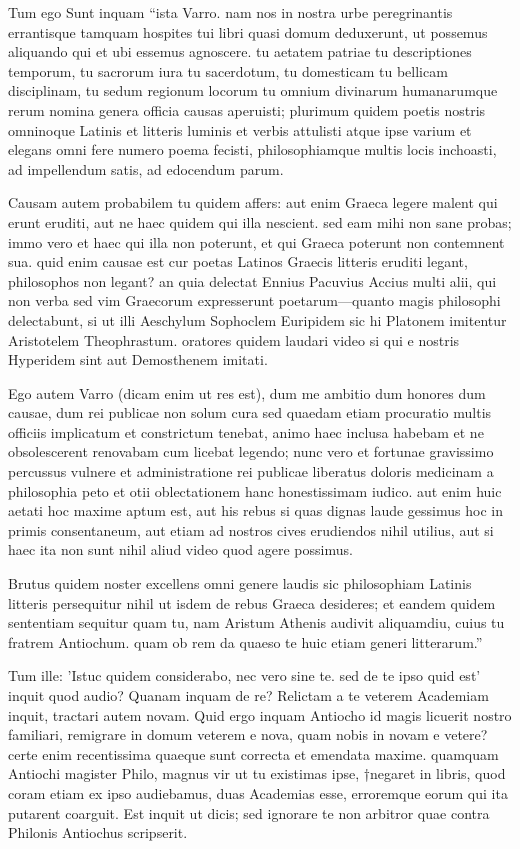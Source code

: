  Tum ego Sunt inquam ``ista Varro. nam nos in nostra urbe peregrinantis errantisque tamquam hospites tui libri quasi domum deduxerunt, ut possemus aliquando qui et ubi essemus agnoscere. tu aetatem patriae tu descriptiones temporum, tu sacrorum iura tu sacerdotum, tu domesticam tu bellicam disciplinam, tu sedum regionum locorum tu omnium divinarum humanarumque rerum nomina genera officia causas aperuisti; plurimum quidem poetis nostris omninoque Latinis et litteris luminis et verbis attulisti atque ipse varium et elegans omni fere numero poema fecisti, philosophiamque multis locis inchoasti, ad impellendum satis, ad edocendum parum.

 Causam autem probabilem tu quidem affers: aut enim Graeca legere malent qui erunt eruditi, aut ne haec quidem qui illa nescient. sed eam mihi non sane probas; immo vero et haec qui illa non poterunt, et qui Graeca poterunt non contemnent sua. quid enim causae est cur poetas Latinos Graecis litteris eruditi legant, philosophos non legant? an quia delectat Ennius Pacuvius Accius multi alii, qui non verba sed vim Graecorum expresserunt poetarum—quanto magis philosophi delectabunt, si ut illi Aeschylum Sophoclem Euripidem sic hi Platonem imitentur Aristotelem Theophrastum. oratores quidem laudari video si qui e nostris Hyperidem sint aut Demosthenem imitati.

 Ego autem Varro (dicam enim ut res est), dum me ambitio dum honores dum causae, dum rei publicae non solum cura sed quaedam etiam procuratio multis officiis implicatum et constrictum tenebat, animo haec inclusa habebam et ne obsolescerent renovabam cum licebat legendo; nunc vero et fortunae gravissimo percussus vulnere et administratione rei publicae liberatus doloris medicinam a philosophia peto et otii oblectationem hanc honestissimam iudico. aut enim huic aetati hoc maxime aptum est, aut his rebus si quas dignas laude gessimus hoc in primis consentaneum, aut etiam ad nostros cives erudiendos nihil utilius, aut si haec ita non sunt nihil aliud video quod agere possimus.

 Brutus quidem noster excellens omni genere laudis sic philosophiam Latinis litteris persequitur nihil ut isdem de rebus Graeca desideres; et eandem quidem sententiam sequitur quam tu, nam Aristum Athenis audivit aliquamdiu, cuius tu fratrem Antiochum. quam ob rem da quaeso te huic etiam generi litterarum.''

 Tum ille: 'Istuc quidem considerabo, nec vero sine te. sed de te ipso quid est' inquit quod audio? Quanam inquam de re? Relictam a te veterem Academiam inquit, tractari autem novam. Quid ergo inquam Antiocho id magis licuerit nostro familiari, remigrare in domum veterem e nova, quam nobis in novam e vetere? certe enim recentissima quaeque sunt correcta et emendata maxime. quamquam Antiochi magister Philo, magnus vir ut tu existimas ipse, †negaret in libris, quod coram etiam ex ipso audiebamus, duas Academias esse, erroremque eorum qui ita putarent coarguit. Est inquit ut dicis; sed ignorare te non arbitror quae contra Philonis Antiochus scripserit.

